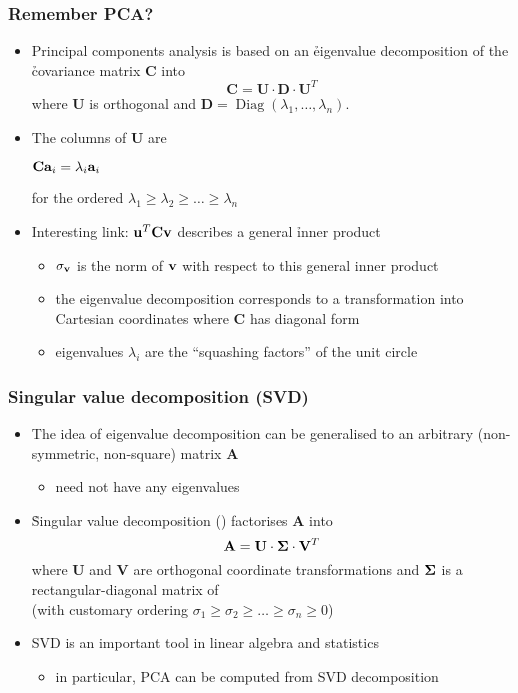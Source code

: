 \begin{frame}
  \frametitle{Remember PCA?}

  \begin{itemize}
  \item Principal components analysis is based on an \h{eigenvalue
      decomposition} of the \h{covariance matrix} $\mathbf{C}$ into
    \[
    \mathbf{C} = \mathbf{U}\cdot \mathbf{D}\cdot \mathbf{U}^T
    \]
    where $\mathbf{U}$ is orthogonal and $\mathbf{D} =
    \mathop{\text{Diag}}(\lambda_1, \ldots, \lambda_n)$.
  \item<2-> The columns of $\mathbf{U}$ are 
    \begin{center}
      $\mathbf{C} \va_i = \lambda_i \va_i$
    \end{center}
    for the ordered  $\lambda_1\geq \lambda_2\geq \dots \geq
    \lambda_n$
    \gap[.5]
  \item<3-> Interesting link: $\vu^T \mathbf{C} \vv$ describes a general
    \h{inner product}
    \begin{itemize}
    \item $\sigma_{\vv}$ is the norm of $\vv$ with respect to this general
      inner product
    \item the eigenvalue decomposition corresponds to a transformation into
      Cartesian coordinates where $\mathbf{C}$ has diagonal form
    \item eigenvalues $\lambda_i$ are the ``squashing factors'' of the unit
      circle
    \end{itemize}
  \end{itemize}
\end{frame}

\begin{frame}
  \frametitle{Singular value decomposition (SVD)}

  \begin{itemize}
  \item The idea of eigenvalue decomposition can be generalised to an
    arbitrary (non-symmetric, non-square) matrix $\mathbf{A}$
    \begin{itemize}
    \item[\hand] need not have any eigenvalues
    \end{itemize}
  \item<2-> \h{Singular value decomposition} () factorises $\mathbf{A}$ into
    \[
    \mathbf{A} = \mathbf{U}\cdot \boldsymbol{\Sigma}\cdot \mathbf{V}^T
    \]
    where $\mathbf{U}$ and $\mathbf{V}$ are orthogonal coordinate
    transformations and $\boldsymbol{\Sigma}$ is a rectangular-diagonal matrix of
    \\
    (with customary ordering $\sigma_1\geq \sigma_2\geq \dots \geq
    \sigma_n\geq 0$)
  \item<3-> SVD is an important tool in linear algebra and statistics
    \begin{itemize}
    \item[\hand] in particular, PCA can be computed from SVD decomposition
    \end{itemize}
  \end{itemize}
\end{frame}

